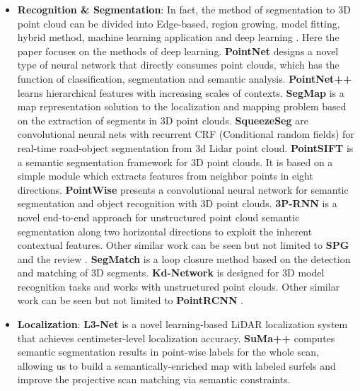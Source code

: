 \documentclass[journal,transmag]{IEEEtran}
\begin{document}
\begin{itemize}
    \item \textbf{Recognition \& Segmentation}: In fact, the method of segmentation to 3D point cloud can be divided into Edge-based, region growing, model fitting, hybrid method, machine learning application and deep learning \cite{grilli2017review}. Here the paper focuses on the methods of deep learning. \textbf{PointNet} \cite{qi2016pointnet} designs a novel type of neural network that directly consumes point clouds, which has the function of classification, segmentation and semantic analysis. \textbf{PointNet++} \cite{qi2017pointnetplusplus} learns hierarchical features with increasing scales of contexts. \textbf{SegMap} \cite{segmap2018} is a map representation solution to the localization and mapping problem based on the extraction of segments in 3D point clouds. \textbf{SqueezeSeg} \cite{wu2017squeezeseg}\cite{wu2018squeezesegv2}\cite{yue2018lidar} are convolutional neural nets with recurrent CRF (Conditional random fields) for real-time road-object segmentation from 3d Lidar point cloud. \textbf{PointSIFT} \cite{jiang2018pointsift} is a semantic segmentation framework for 3D point clouds. It is based on a simple module which extracts features from neighbor points in eight directions. \textbf{PointWise} \cite{hua-pointwise-cvpr18} presents a convolutional neural network for semantic segmentation and object recognition with 3D point clouds. \textbf{3P-RNN} \cite{ye20183d} is a novel end-to-end approach for unstructured point cloud semantic segmentation along two horizontal directions to exploit the inherent contextual features. Other similar work can be seen but not limited to \textbf{SPG} \cite{landrieu2018large} and the review \cite{grilli2017review}. \textbf{SegMatch} \cite{dube2017segmatch} is a loop closure method based on the detection and matching of 3D segments. \textbf{Kd-Network}  \cite{klokov2017escape} is designed for 3D model recognition tasks and works with unstructured point clouds. Other similar work can be seen but not limited to \textbf{PointRCNN} \cite{shi2019pointrcnn}.
    \item \textbf{Localization}:  \textbf{L3-Net} \cite{L3-Net} is a novel learning-based LiDAR localization system that achieves centimeter-level localization accuracy. \textbf{SuMa++} \cite{Chen2019suma} computes semantic segmentation results in point-wise labels for the whole scan, allowing us to build a semantically-enriched map with labeled surfels and  improve the projective scan matching via semantic constraints.
\end{itemize}
\end{document}
